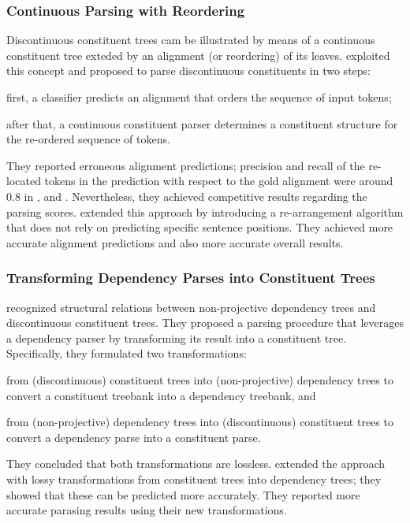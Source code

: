 \documentclass[../document.tex]{subfiles}
\begin{document}
    \subsubsection*{Continuous Parsing with Reordering}
    Discontinuous constituent trees cam be illustrated by means of a continuous constituent tree exteded by an alignment (or reordering) of its leaves.
     exploited this concept and proposed to parse discontinuous constituents in two steps:
    \begin{inparaenum}[]
        \item first, a classifier predicts an alignment that orders the sequence of input tokens; 
        \item after that, a continuous constituent parser determines a constituent structure for the re-ordered sequence of tokens.
    \end{inparaenum}
    They reported erroneous alignment predictions; precision and recall of the re-located tokens in the prediction with respect to the gold alignment were around $0.8$ in \dptb{}, \negra{} and \tiger{}.
    Nevertheless, they achieved competitive results regarding the parsing scores.
     extended this approach by introducing a re-arrangement algorithm that does not rely on predicting specific sentence positions.
    They achieved more accurate alignment predictions and also more accurate overall results.

    \subsubsection*{Transforming Dependency Parses into Constituent Trees}
     recognized structural relations between non-projective dependency trees and discontinuous constituent trees.
    They proposed a parsing procedure that leverages a dependency parser by transforming its result into a constituent tree.
    Specifically, they formulated two transformations:
    \begin{inparaenum}
        \item from (discontinuous) constituent trees into (non-projective) dependency trees to convert a constituent treebank into a dependency treebank, and
        \item from (non-projective) dependency trees into (discontinuous) constituent trees to convert a dependency parse into a constituent parse.
    \end{inparaenum}
    They concluded that both transformations are lossless.
     extended the approach with lossy transformations from constituent trees into dependency trees; they showed that these can be predicted more accurately.
    They reported more accurate parasing results using their new transformations.
\end{document}
